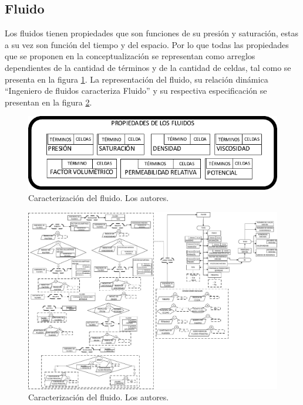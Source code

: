 \subsection{Fluido}\label{sec:PS_Phase}

Los fluidos tienen propiedades que son funciones de su presión y saturación, estas a su vez son función del tiempo y del espacio. Por lo que todas las propiedades que se proponen en la conceptualización se representan como arreglos dependientes de la cantidad de términos y de la cantidad de celdas, tal como se presenta en la figura \ref{fig:FluidProps}. La representación del fluido, su relación dinámica ``Ingeniero de fluidos caracteriza Fluido'' y su respectiva especificación se presentan en la figura \ref{fig:Fluid}.\\

\begin{figure}[h]
	\centering%
	\includegraphics[width=0.9\linewidth]{Fig/PropiedadesDeFluidos.pdf}%
	\caption[Caracterización del fluido.]{Caracterización del fluido. Los autores.} \label{fig:FluidProps}
\end{figure}

\begin{figure}[h]
	\centering%
	\includegraphics[width=0.9\linewidth]{Fig/Fluid.pdf}%
	\caption[Caracterización del fluido.]{Caracterización del fluido. Los autores.} \label{fig:Fluid}
\end{figure}

